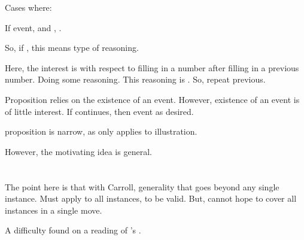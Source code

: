 \begin{note}
  \begin{proposition}
    Cases where:

    If event, and \sTR{}, \fc{}.
  \end{proposition}

  So, if \tR{}, this means type of reasoning.

  Here, the interest is with respect to filling in a number after filling in a previous number.
  Doing some reasoning.
  This reasoning is \tR{}.
  So, repeat previous.
\end{note}

\begin{note}
  Proposition relies on the existence of an event.
  However, existence of an event is of little interest.
  If continues, then event as desired.
\end{note}

\begin{note}
  proposition is narrow, as only applies to illustration.

  However, the motivating idea is general.
\end{note}

\section{\citeauthor{Carroll:1895uj}}

\nocite{Black:1951aa}

\begin{note}
  The point here is that with Carroll, generality that goes beyond any single instance.
  Must apply to all instances, to be valid.
  But, cannot hope to cover all instances in a single move.
\end{note}

\begin{note}
  A difficulty found on a reading of \citeauthor{Carroll:1895uj}'s .
\end{note}

